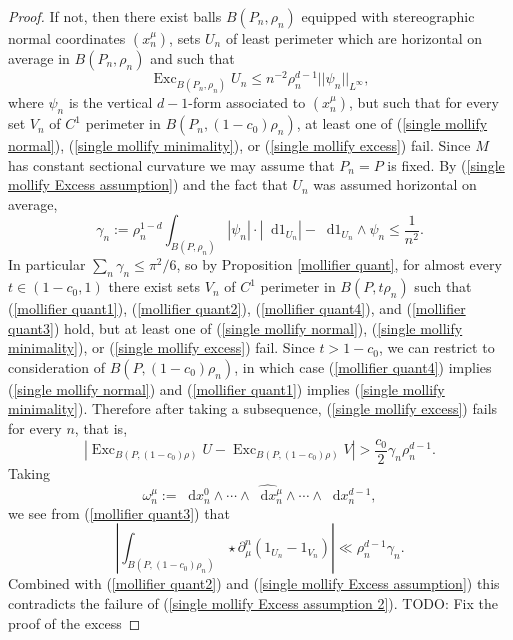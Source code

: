 \documentclass[reqno,10pt]{amsart}
\DeclareMathOperator{\Exc}{Exc}
\newcommand*\dif{\mathop{}\!\mathrm{d}}
\theoremstyle{definition}
\numberwithin{equation}{section}
\begin{document}
\begin{proof}
If not, then there exist balls $B(P_n, \rho_n)$ equipped with stereographic normal coordinates $(x^\mu_n)$, sets $U_n$ of least perimeter which are horizontal on average in $B(P_n, \rho_n)$ and such that
\begin{equation}\label{single mollify Excess assumption}
\Exc_{B(P_n, \rho_n)} U_n \leq n^{-2} \rho_n^{d - 1} ||\psi_n||_{L^\infty},
\end{equation}
where $\psi_n$ is the vertical $d-1$-form associated to $(x^\mu_n)$, but such that for every set $V_n$ of $C^1$ perimeter in $B(P_n, (1 - c_0) \rho_n)$, at least one of (\ref{single mollify normal}), (\ref{single mollify minimality}), or (\ref{single mollify excess}) fail.
Since $M$ has constant sectional curvature we may assume that $P_n = P$ is fixed.
By (\ref{single mollify Excess assumption}) and the fact that $U_n$ was assumed horizontal on average, 
$$\gamma_n := \rho_n^{1 - d} \int_{B(P, \rho_n)} |\psi_n| \cdot |\dif 1_{U_n}| - \dif 1_{U_n} \wedge \psi_n \leq \frac{1}{n^2}.$$
In particular $\sum_n \gamma_n \leq \pi^2/6$, so by Proposition \ref{mollifier quant}, for almost every $t \in (1 - c_0, 1)$ there exist sets $V_n$ of $C^1$ perimeter in $B(P, t\rho_n)$ such that (\ref{mollifier quant1}), (\ref{mollifier quant2}), (\ref{mollifier quant4}), and (\ref{mollifier quant3}) hold, but at least one of (\ref{single mollify normal}), (\ref{single mollify minimality}), or (\ref{single mollify excess}) fail.
Since $t > 1 - c_0$, we can restrict to consideration of $B(P, (1 - c_0) \rho_n)$, in which case (\ref{mollifier quant4}) implies (\ref{single mollify normal}) and (\ref{mollifier quant1}) implies (\ref{single mollify minimality}).
Therefore after taking a subsequence, (\ref{single mollify excess}) fails for every $n$, that is,
\begin{equation}\label{single mollify Excess assumption 2}
|\Exc_{B(P, (1 - c_0)\rho)} U - \Exc_{B(P, (1 - c_0) \rho)} V| > \frac{c_0}{2} \gamma_n \rho_n^{d - 1}.
\end{equation}
Taking
$$\omega_n^\mu := \dif x^0_n \wedge \cdots \wedge \widehat{\dif x^\mu_n} \wedge \cdots \wedge \dif x^{d - 1}_n,$$
we see from (\ref{mollifier quant3}) that
$$\left|\int_{B(P, (1 - c_0)\rho_n)} \star \partial_\mu^n (1_{U_n} - 1_{V_n})\right| \ll \rho_n^{d - 1} \gamma_n.$$
Combined with (\ref{mollifier quant2}) and (\ref{single mollify Excess assumption}) this contradicts the failure of (\ref{single mollify Excess assumption 2}).
TODO: Fix the proof of the excess
\end{proof}
\end{document}
